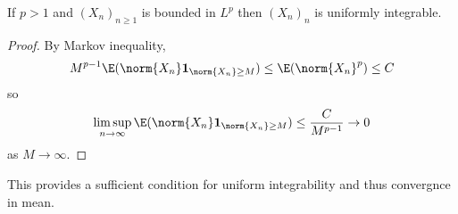 \documentclass[a4paper]{article}
\begin{document}
\begin{proposition}
  If \(p > 1\) and \((X_n)_{n \geq 1}\) is bounded in \(L^p\) then \((X_n)_n\) is uniformly integrable.
\end{proposition}

\begin{proof}
  By Markov inequality,
  \[
    M^{p - 1} \E(\norm{X_n} \mathbf 1_{\norm{X_n} \geq M}) \leq \E( \norm{X_n}^p) \leq C
  \]
  so
  \[
    \limsup_{n \to \infty} \E(\norm{X_n} \mathbf 1_{\norm{X_n} \geq M}) \leq \frac{C}{M^{p - 1}} \to 0
  \]
  as \(M \to \infty\).
\end{proof}
This provides a sufficient condition for uniform integrability and thus convergnce in mean.


















\printindex
\end{document}
